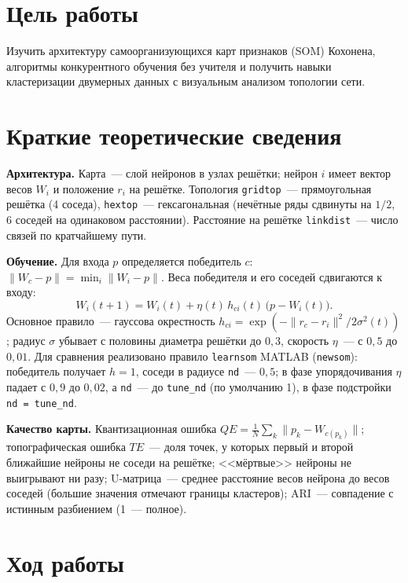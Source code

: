 \documentclass[14pt,a4paper]{extarticle}
\begin{document}

\section{Цель работы}

Изучить архитектуру самоорганизующихся карт признаков (SOM) Кохонена, алгоритмы конкурентного обучения без учителя и получить навыки кластеризации двумерных данных с визуальным анализом топологии сети.

\section{Краткие теоретические сведения}

\textbf{Архитектура.} Карта~--- слой нейронов в узлах решётки; нейрон $i$ имеет вектор весов $W_i$ и положение $r_i$ на решётке. Топология \texttt{gridtop}~--- прямоугольная решётка (4 соседа), \texttt{hextop}~--- гексагональная (нечётные ряды сдвинуты на $1/2$, 6 соседей на одинаковом расстоянии). Расстояние на решётке \texttt{linkdist}~--- число связей по кратчайшему пути.

\textbf{Обучение.} Для входа $p$ определяется победитель $c$: $\lVert W_c - p \rVert = \min_i \lVert W_i - p \rVert$. Веса победителя и его соседей сдвигаются к входу:
\begin{equation}
W_i(t+1) = W_i(t) + \eta(t)\,h_{ci}(t)\,\bigl(p - W_i(t)\bigr).
\end{equation}
Основное правило~--- гауссова окрестность $h_{ci} = \exp(-\lVert r_c - r_i\rVert^2 / 2\sigma^2(t))$; радиус $\sigma$ убывает с половины диаметра решётки до $0{,}3$, скорость $\eta$~--- с $0{,}5$ до $0{,}01$. Для сравнения реализовано правило \texttt{learnsom} MATLAB (\texttt{newsom}): победитель получает $h = 1$, соседи в радиусе \texttt{nd}~--- $0{,}5$; в фазе упорядочивания $\eta$ падает с $0{,}9$ до $0{,}02$, а \texttt{nd}~--- до \texttt{tune\_nd} (по умолчанию 1), в фазе подстройки \texttt{nd = tune\_nd}.

\textbf{Качество карты.} Квантизационная ошибка $QE = \frac1N\sum_k \lVert p_k - W_{c(p_k)}\rVert$; топографическая ошибка $TE$~--- доля точек, у которых первый и второй ближайшие нейроны не соседи на решётке; <<мёртвые>> нейроны не выигрывают ни разу; U-матрица~--- среднее расстояние весов нейрона до весов соседей (большие значения отмечают границы кластеров); ARI~--- совпадение с истинным разбиением (1~--- полное).

\section{Ход работы}
\end{document}
